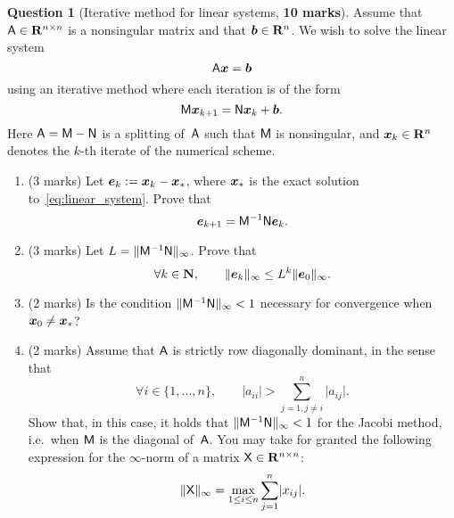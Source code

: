 \documentclass[11pt]{article}
\theoremstyle{definition}
\newtheorem{question}{Question}
\begin{document}
\newpage
\begin{question}
    [Iterative method for linear systems, \textbf{10 marks}]
    Assume that $\mathsf A \in \mathbf R^{n \times n}$ is a nonsingular matrix and that $\mathbf{\boldsymbol{b}} \in \mathbf R^n$.
    We wish to solve the linear system
    \begin{equation}
        \label{eq:linear_system}
        \mathsf A \mathbf{\boldsymbol{x}} = \mathbf{\boldsymbol{b}}
    \end{equation}
    using an iterative method where each iteration is of the form
    \[
        \mathsf M \mathbf{\boldsymbol{x}}_{k+1} = \mathsf N \mathbf{\boldsymbol{x}}_k + \mathbf{\boldsymbol{b}}.
    \]
    Here $\mathsf A = \mathsf M - \mathsf N$ is a splitting of~$\mathsf A$ such that $\mathsf M$ is nonsingular,
    and $\mathbf{\boldsymbol{x}}_k \in \mathbf R^n$ denotes the $k$-th iterate of the numerical scheme.

    \begin{enumerate}
        \item
            (3 marks)
            Let $\mathbf{\boldsymbol{e}}_k := \mathbf{\boldsymbol{x}}_k - \mathbf{\boldsymbol{x}}_*$,
            where $\mathbf{\boldsymbol{x}}_*$ is the exact solution to~\eqref{eq:linear_system}.
            Prove that
            \[
                \mathbf{\boldsymbol{e}}_{k+1} = \mathsf M^{-1} \mathsf N \mathbf{\boldsymbol{e}}_k.
            \]

        \item
            (3 marks)
            Let $L = \lVert\mathsf M^{-1} \mathsf N\rVert_{\infty}$.
            Prove that
            \[
                \forall k \in \mathbf N, \qquad
                \lVert\mathbf{\boldsymbol{e}}_k\rVert_{\infty} \leq L^k \lVert\mathbf{\boldsymbol{e}}_0\rVert_{\infty}.
            \]

        \item
            (2 marks)
            Is the condition $\lVert\mathsf M^{-1} \mathsf N\rVert_{\infty} < 1$ necessary
            for convergence when $\mathbf{\boldsymbol{x}}_0 \neq \mathbf{\boldsymbol{x}}_*$?

        \item
            (2 marks)
            Assume that $\mathsf A$ is strictly row diagonally dominant, in the sense that
            \[
                \forall i \in \{1, \dotsc, n\}, \qquad
                \lvert a_{ii} \rvert > \sum_{j=1, j\neq i}^{n} \lvert a_{ij} \rvert.
            \]
            Show that, in this case, it holds that $\lVert\mathsf M^{-1} \mathsf N\rVert_{\infty} < 1$ for the Jacobi method,
            i.e.\ when $\mathsf M$ is the diagonal of~$\mathsf A$.
            You may take for granted the following expression for the $\infty$-norm of a matrix $\mathsf X \in \mathbf R^{n \times n}$:
            \[
                \lVert\mathsf X\rVert_{\infty} = \max_{1 \leq i \leq n} \sum_{j=1}^{n} \lvert x_{ij}\rvert.
            \]


\end{enumerate}
\end{question}
\end{document}

